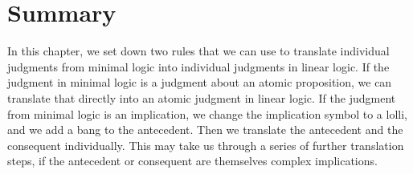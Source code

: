 \documentclass[../../../main.tex]{subfiles}
\begin{document}
\section{Summary}

In this chapter, we set down two rules that we can use to translate individual judgments from minimal logic into individual judgments in linear logic. If the judgment in minimal logic is a judgment about an atomic proposition, we can translate that directly into an atomic judgment in linear logic. If the judgment from minimal logic is an implication, we change the implication symbol to a lolli, and we add a bang to the antecedent. Then we translate the antecedent and the consequent individually. This may take us through a series of further translation steps, if the antecedent or consequent are themselves complex implications.
\end{document}
